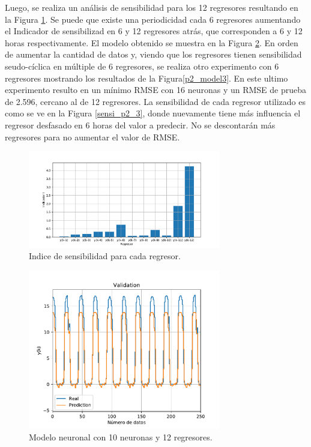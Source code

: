 \documentclass[12pt]{article}
\begin{document}
Luego, se realiza un análisis de sensibilidad para los 12 regresores resultando en la Figura \ref{p2_sensi}. Se puede que existe una periodicidad cada 6 regresores aumentando el Indicador de sensibilizad en 6 y 12 regresores atrás, que corresponden a 6 y 12 horas respectivamente. El modelo obtenido se muestra en la Figura \ref{Model_nn}. En orden de aumentar la cantidad de datos y, viendo que los regresores tienen sensibilidad seudo-cíclica en múltiple de 6 regresores, se realiza otro experimento con 6 regresores mostrando los resultados de la Figura\ref{p2_model3}. En este ultimo experimento resulto en un mínimo RMSE con 16 neuronas y un RMSE de prueba de 2.596, cercano al de 12 regresores. La sensibilidad de cada regresor utilizado es como se ve en la Figura \ref{sensi_p2_3}, donde nuevamente tiene más influencia el regresor desfasado en 6 horas del valor a predecir. No se descontarán más regresores para no aumentar el valor de RMSE.
\begin{figure}[h!]
	\centering
	\captionsetup{justification=centering}
	 \includegraphics[width=0.75\textwidth]{imag/redes/sensi_p2.pdf}
	\caption{Indice de sensibilidad para cada regresor.}
	\label{p2_sensi}
\end{figure}
\begin{figure}[h!]
	\centering
	\captionsetup{justification=centering}
	 \includegraphics[width=0.75\textwidth]{imag/redes/model_p2.pdf}
	\caption{Modelo neuronal con 10 neuronas y 12 regresores.}
	\label{Model_nn}
\end{figure}
\end{document}
